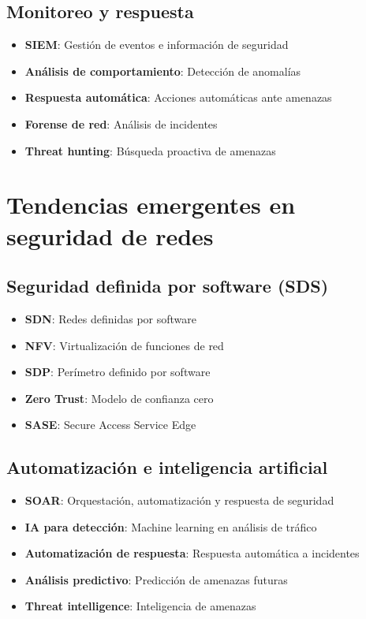 \subsection{Monitoreo y respuesta}

\begin{itemize}
    \item \textbf{SIEM}: Gestión de eventos e información de seguridad
    \item \textbf{Análisis de comportamiento}: Detección de anomalías
    \item \textbf{Respuesta automática}: Acciones automáticas ante amenazas
    \item \textbf{Forense de red}: Análisis de incidentes
    \item \textbf{Threat hunting}: Búsqueda proactiva de amenazas
\end{itemize}

\section{Tendencias emergentes en seguridad de redes}

\subsection{Seguridad definida por software (SDS)}

\begin{itemize}
    \item \textbf{SDN}: Redes definidas por software
    \item \textbf{NFV}: Virtualización de funciones de red
    \item \textbf{SDP}: Perímetro definido por software
    \item \textbf{Zero Trust}: Modelo de confianza cero
    \item \textbf{SASE}: Secure Access Service Edge
\end{itemize}

\subsection{Automatización e inteligencia artificial}

\begin{itemize}
    \item \textbf{SOAR}: Orquestación, automatización y respuesta de seguridad
    \item \textbf{IA para detección}: Machine learning en análisis de tráfico
    \item \textbf{Automatización de respuesta}: Respuesta automática a incidentes
    \item \textbf{Análisis predictivo}: Predicción de amenazas futuras
    \item \textbf{Threat intelligence}: Inteligencia de amenazas
\end{itemize}

